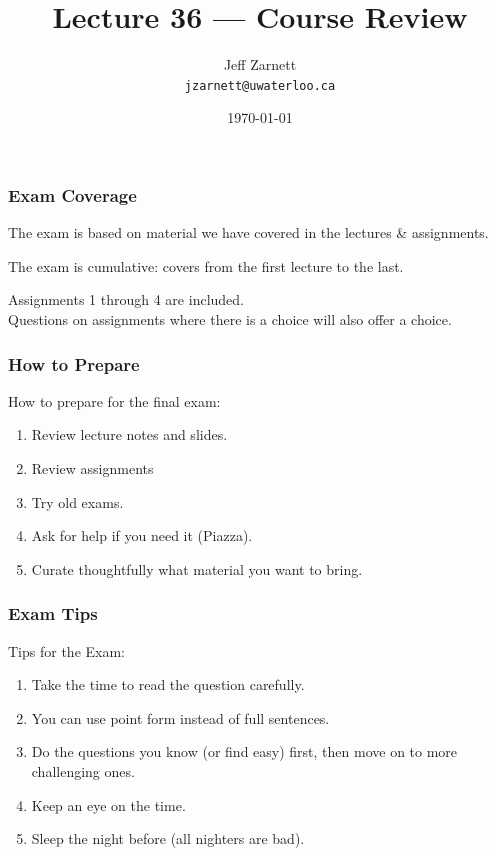 

\title{Lecture 36 --- Course Review }

\author{Jeff Zarnett \\ \small \texttt{jzarnett@uwaterloo.ca}}
\date{\today}




\begin{frame}
  \titlepage

\end{frame}

\begin{frame}
\frametitle{Exam Coverage}

The exam is based on material we have covered in the lectures \& assignments.

The exam is cumulative: covers from the first lecture to the last.

Assignments 1 through 4 are included.\\
\quad Questions on assignments where there is a choice will also offer a choice.

\end{frame}

\begin{frame}
\frametitle{How to Prepare}

How to prepare for the final exam:

\begin{enumerate}
	\item Review lecture notes and slides.
	\item Review assignments
	\item Try old exams.
	\item Ask for help if you need it (Piazza).
	\item Curate thoughtfully what material you want to bring.
\end{enumerate}

\end{frame}

\begin{frame}
\frametitle{Exam Tips}

Tips for the Exam:

\begin{enumerate}
	\item Take the time to read the question carefully.
	\item You can use point form instead of full sentences.
	\item Do the questions you know (or find easy) first, then move on to more challenging ones.
	\item Keep an eye on the time.
	\item Sleep the night before (all nighters are bad).
	
\end{enumerate}

\end{frame}


